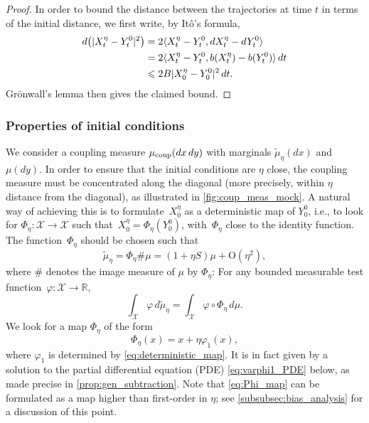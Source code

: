 \documentclass[11pt]{article}
\newcommand{\R}{\mathbb{R}}
\newcommand{\X}{\mathcal{X}}
\newcommand{\bigO}{\mathrm{O}}
\renewcommand{\leq}{\leqslant}
\DeclarePairedDelimiter\ip{\langle}{\rangle}
\theoremstyle{definition}
\newcommand{\psip}{\widetilde{\mu}_\eta}
\newcommand{\mucoup}{\mu_{\rm coup}}
\begin{document}
\begin{proof}In order to bound the distance between the trajectories at time $t$ in terms of the initial distance, we first write, by It\^o's formula,
\begin{align}
		d\bigl(|X_t^\eta - Y_t^0|^2\bigr) &= 2\ip{X_t^\eta - Y_t^0, dX_t^\eta - dY^0_t} \\
		&= 2\langle X_t^\eta - Y_t^0, b(X_t^\eta) - b(Y_t^0)\rangle \, dt \\
		&\leq 2B|X_0^\eta - Y_0^0|^2 \, dt.
		\label{eq:ito_dissip}
	\end{align}
Gr\"onwall's lemma then gives the claimed bound. \end{proof}

\subsubsection{Properties of initial conditions}
\label{subsubsec:properties_init_cond}
We consider a coupling measure $\mucoup(dx \, dy)$ with marginals $\psip(dx)$ and $\mu(dy)$. In order to ensure that the initial conditions are $\eta$ close, the coupling measure must be concentrated along the diagonal (more precisely, within $\eta$ distance from the diagonal), as illustrated in \cref{fig:coup_meas_mock}. A natural way of achieving this is to formulate~$X_0^\eta$ as a deterministic map of $Y_0^0$, i.e., to look for $\Phi_\eta \colon \mathcal{X} \to \mathcal{X}$ such that~$X_0^\eta = \Phi_\eta(Y_0^0)$, with~$\Phi_\eta$ close to the identity function. The function~$\Phi_\eta$ should be chosen such that
\begin{equation}
	\psip = \Phi_\eta \# \mu = (1+\eta S)\mu + \bigO(\eta^2),
	\label{eq:deterministic_map}
\end{equation}
where $\#$ denotes the image measure of $\mu$ by $\Phi_\eta$: For any bounded measurable test function~$\varphi\colon \X \to \R$,
\begin{equation}
	\int_\mathcal{X} \varphi \, d\psip = \int_\mathcal{X} \varphi \circ \Phi_\eta \, d\mu.
\end{equation}
We look for a map $\Phi_\eta$ of the form
\begin{equation}
	\Phi_\eta(x) = x + \eta\varphi_1(x),
	\label{eq:Phi_map}
\end{equation}
where $\varphi_1$ is determined by \eqref{eq:deterministic_map}. It is in fact given by a solution to the partial differential equation (PDE) \eqref{eq:varphi1_PDE} below, as made precise in \cref{prop:gen_subtraction}.
Note that \eqref{eq:Phi_map} can be formulated as a map higher than first-order in $\eta$; see \cref{subsubsec:bias_analysis} for a discussion of this point.
\end{document}
